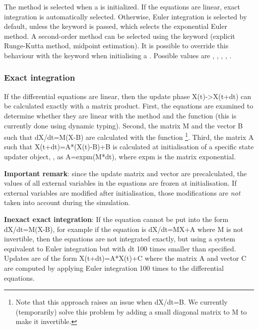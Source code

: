 \documentclass[letterpaper,10pt,english]{manual}
\begin{document}
The method is selected when a \hyperlink{brian.NeuronGroup}{} is initialized.
If the equations are linear, exact integration is automatically selected.
Otherwise, Euler integration is selected by default, unless the keyword
 is passed, which selects the exponential Euler method. A second-order method
can be selected using the keyword  (explicit Runge-Kutta method, midpoint estimation).
It is possible to override this behaviour with the  keyword when initialising
a \hyperlink{brian.NeuronGroup}{}. Possible values are , ,
, , .

\hypertarget{index-10}{}\subsubsection{Exact integration}

If the differential equations are linear, then the update phase
X(t)-\textgreater{}X(t+dt) can be calculated exactly with a matrix product.
First, the equations are examined to determine whether they are linear
with the method  and the function
 (this is currently done using dynamic typing).
Second, the matrix M and the vector B such that dX/dt=M(X-B) are calculated with
the function  \footnote{
Note that this approach raises an issue when dX/dt=B. We currently (temporarily)
solve this problem by adding a small diagonal matrix to M to make it invertible.
}.
Third, the matrix A such that X(t+dt)=A*(X(t)-B)+B is calculated at initialisation
of a specific state updater object, \hyperlink{brian.LinearStateUpdater}{},
as A=expm(M*dt), where expm is the matrix exponential.

\textbf{Important remark}: since the update matrix and vector are precalculated,
the values of all external variables in the equations are frozen at
initialisation. If external variables are modified after initialisation,
those modifications are \emph{not} taken into account during the simulation.

\textbf{Inexact exact integration}: If the equation cannot be put into the form dX/dt=M(X-B),
for example if the equation is dX/dt=MX+A where M is not invertible, then the equations
are not integrated exactly, but using a system equivalent to Euler integration but with
dt 100 times smaller than specified. Updates are of the form X(t+dt)=A*X(t)+C where the
matrix A and vector C are computed by applying Euler integration 100 times to the
differential equations.
\end{document}
